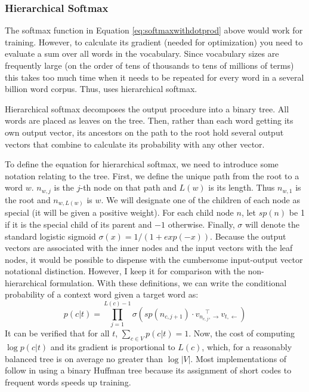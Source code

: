 \subsubsection{Hierarchical Softmax}

The softmax function in Equation \ref{eq:softmaxwithdotprod} above would work 
for training. However, to calculate its 
gradient (needed for optimization) you need to evaluate a sum over all words
in the vocabulary. Since vocabulary sizes are frequently large (on the order of
tens of thousands to tens of millions of terms) this takes too much time when it
needs to be repeated for every word in a several billion word corpus. Thus, 
\modelname{} uses hierarchical softmax.

Hierarchical softmax decomposes the output procedure into a binary tree. All
words are placed as leaves on the tree. Then, rather than each word getting its 
own output vector, its ancestors on the path to the root hold several output
vectors that combine to calculate its probability with any other vector.

To define the equation for hierarchical softmax, we need to introduce some 
notation relating to the tree. First, we define the unique path from the root
to a word $w$. $n_{w,j}$ is the $j$-th node on that path and $L(w)$ is its
length. Thus $n_{w,1}$ is the root and $n_{w,L(w)}$ is $w$. We will designate
one of the children of each node as special (it will be given a positive 
weight). For each child node $n$, let $sp(n)$ be 1 if it is the special child
of its parent and $-1$ otherwise.
Finally, $\sigma$ will denote the standard logistic sigmoid 
$\sigma(x)=1/(1+exp(-x))$. Because 
the output vectors are associated with the inner nodes and the input vectors 
with the leaf nodes, it would be possible to dispense with the cumbersome 
input-output vector notational distinction. However, I keep it for 
comparison with the non-hierarchical formulation. With
these definitions, we can write the conditional probability of a context word
given a target word as:
%
\[p(c|t)=\prod_{j=1}^{L(c)-1} \sigma\left(sp\left(n_{c,j+1}\right)
\cdot v_{n_{c,j},\to}^{\quad\top} v_{t,\gets}\right)\]
%
It can be verified that for all $t$, $\sum_{c\in{}V}p(c|t)=1$. Now, the cost
of computing $\log p(c|t)$ and its gradient is proportional to $L(c)$, which, 
for a reasonably balanced tree is on average no greater than $\log |V|$. Most
implementations of \modelname{} follow \citep{Mikolov2013c} in using a binary
Huffman tree because its assignment of short codes to frequent words speeds
up training.

